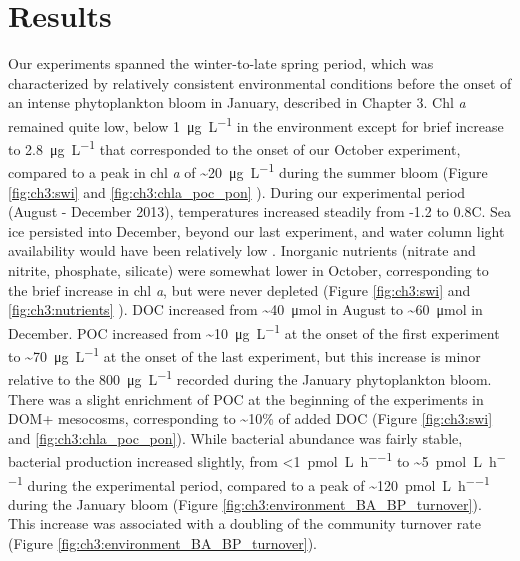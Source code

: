 \section{Results}

Our experiments spanned the winter-to-late spring period, which was characterized by relatively consistent environmental conditions before the onset of an intense phytoplankton bloom in January, described in Chapter 3. Chl \emph{a} remained quite low, below \SI{1}{\micro\gram \per\liter} in the environment except for brief increase to \SI{2.8}{\micro\gram \per\liter} that corresponded to the onset of our October experiment, compared to a peak in chl \emph{a} of \textasciitilde{}\SI{20}{\micro\gram \per\liter} during the summer bloom (Figure \ref{fig:ch3:swi}  and \ref{fig:ch3:chla_poc_pon} ). During our experimental period (August - December 2013), temperatures increased steadily from -1.2 to 0.8\textdegree C. Sea ice persisted into December, beyond our last experiment, and water column light availability would have been relatively low \citep{massom2014state}. Inorganic nutrients (nitrate and nitrite, phosphate, silicate) were somewhat lower in October, corresponding to the brief increase in chl \emph{a}, but were never depleted (Figure \ref{fig:ch3:swi}  and \ref{fig:ch3:nutrients} ). DOC increased from \textasciitilde{}\SI{40}{\micro\mole} in August to \textasciitilde{}\SI{60}{\micro\mole}  in December. POC increased from \textasciitilde{}\SI{10}{\micro\gram \per\liter}  at the onset of the first experiment to \textasciitilde{}\SI{70}{\micro\gram \per\liter}  at the onset of the last experiment, but this increase is minor relative to the \SI{800}{\micro\gram \per\liter}  recorded during the January phytoplankton bloom. There was a slight enrichment of POC at the beginning of the experiments in DOM+ mesocosms, corresponding to \textasciitilde{}10\% of added DOC (Figure \ref{fig:ch3:swi}  and \ref{fig:ch3:chla_poc_pon}). While bacterial abundance was fairly stable, bacterial production increased slightly, from {\textless}\SI{1}{\pico\mole \per\liter \per\hour} to \textasciitilde{}\SI{5}{\pico\mole \per\liter \per\hour}  during the experimental period, compared to a peak of \textasciitilde{}\SI{120}{\pico\mole \per\liter \per\hour}  during the January bloom (Figure \ref{fig:ch3:environment_BA_BP_turnover}). This increase was associated with a doubling of the community turnover rate (Figure \ref{fig:ch3:environment_BA_BP_turnover}). 

